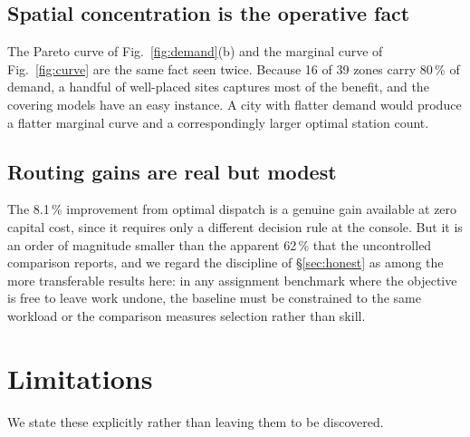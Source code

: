 \documentclass[conference]{IEEEtran}
\begin{document}
\subsection{Spatial concentration is the operative fact}

The Pareto curve of Fig.~\ref{fig:demand}(b) and the marginal curve of
Fig.~\ref{fig:curve} are the same fact seen twice. Because 16 of 39 zones carry
80\,\% of demand, a handful of well-placed sites captures most of the benefit,
and the covering models have an easy instance. A city with flatter demand would
produce a flatter marginal curve and a correspondingly larger optimal station
count.

\subsection{Routing gains are real but modest}

The 8.1\,\% improvement from optimal dispatch is a genuine gain available at
zero capital cost, since it requires only a different decision rule at the
console.
But it is an order of magnitude smaller than the apparent 62\,\% that the
uncontrolled comparison reports, and we regard the discipline of
\S\ref{sec:honest} as among the more transferable results here: in any
assignment benchmark where the objective is free to leave work undone, the
baseline must be constrained to the same workload or the comparison measures
selection rather than skill.

\section{Limitations}
\label{sec:limits}

We state these explicitly rather than leaving them to be discovered.
\end{document}
